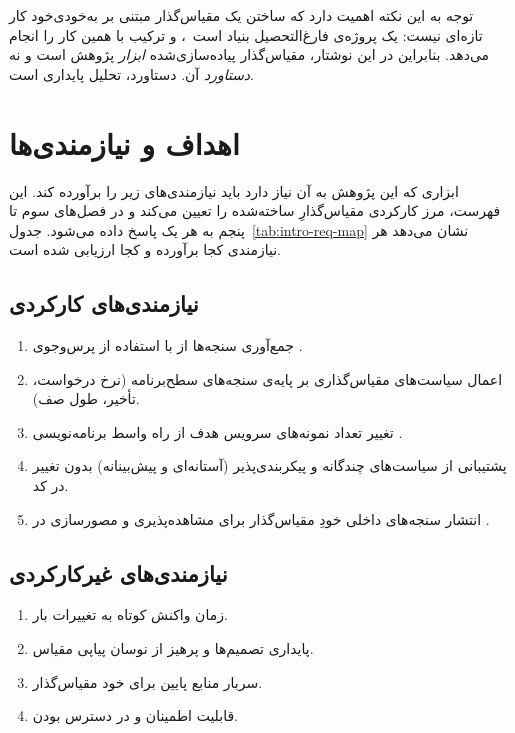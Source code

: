 توجه به این نکته اهمیت دارد که ساختن یک مقیاس‌گذار مبتنی بر  به‌خودی‌خود کار
تازه‌ای نیست:  یک پروژه‌ی فارغ‌التحصیل بنیاد  است~\cite{kedagraduation}،
و ترکیب  با  همین کار را انجام می‌دهد. بنابراین در این
نوشتار، مقیاس‌گذار پیاده‌سازی‌شده \emph{ابزار} پژوهش است و نه \emph{دستاورد} آن. دستاورد،
تحلیل پایداری است.

\section{اهداف و نیازمندی‌ها}
\label{sec:intro-requirements}

ابزاری که این پژوهش به آن نیاز دارد باید نیازمندی‌های زیر را برآورده کند. این فهرست، مرز
کارکردی مقیاس‌گذارِ ساخته‌شده را تعیین می‌کند و در فصل‌های سوم تا پنجم به هر یک پاسخ داده
می‌شود. جدول~\ref{tab:intro-req-map} نشان می‌دهد هر نیازمندی کجا برآورده و کجا ارزیابی شده
است.

\subsection*{نیازمندی‌های کارکردی}

\begin{enumerate}
  \item جمع‌آوری سنجه‌ها از  با استفاده از پرس‌وجوی .
  \item اعمال سیاست‌های مقیاس‌گذاری بر پایه‌ی سنجه‌های سطح‌برنامه (نرخ درخواست، تأخیر، طول صف).
  \item تغییر تعداد نمونه‌های سرویس هدف از راه واسط برنامه‌نویسی .
  \item پشتیبانی از سیاست‌های چندگانه و پیکربندی‌پذیر (آستانه‌ای و پیش‌بینانه) بدون تغییر در کد.
  \item انتشار سنجه‌های داخلی خودِ مقیاس‌گذار برای مشاهده‌پذیری و مصورسازی در .
\end{enumerate}

\subsection*{نیازمندی‌های غیرکارکردی}

\begin{enumerate}
  \item زمان واکنش کوتاه به تغییرات بار.
  \item پایداری تصمیم‌ها و پرهیز از نوسان پیاپی مقیاس.
  \item سربار منابع پایین برای خود مقیاس‌گذار.
  \item قابلیت اطمینان و در دسترس بودن.
\end{enumerate}

